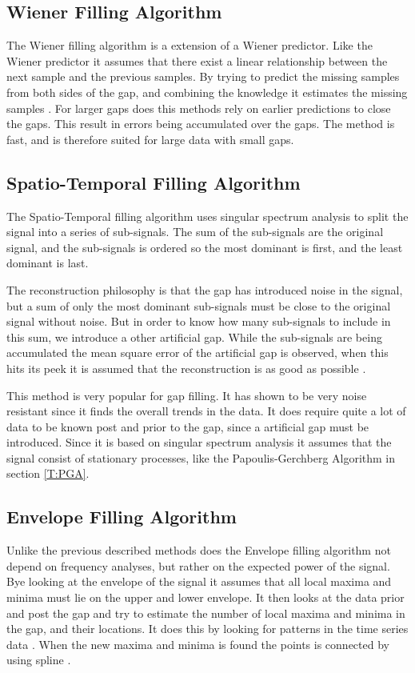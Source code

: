 \subsection{Wiener Filling Algorithm}
The Wiener filling algorithm is a extension of a Wiener predictor. Like the Wiener predictor it assumes that there exist a linear relationship between the next sample and the previous samples. By trying to predict the missing samples from both sides of the gap, and combining the knowledge it estimates the missing samples \citep{RefWorks:14}. For larger gaps does this methods rely on earlier predictions to close the gaps. This result in errors being accumulated over the gaps. The method is fast, and is therefore suited for large data with small gaps. 

\subsection{Spatio-Temporal Filling Algorithm}
The Spatio-Temporal filling algorithm uses singular spectrum analysis to split the signal into a series of sub-signals. The sum of the sub-signals are the original signal, and the sub-signals is ordered so the most dominant is first, and the least dominant is last. 

The reconstruction philosophy is that the gap has introduced noise in the signal, but a sum of only the most dominant sub-signals must be close to the original signal without noise. But in order to know how many sub-signals to include in this sum, we introduce a other artificial gap. While the sub-signals are being accumulated the mean square error of the artificial gap is observed, when this hits its peek it is assumed that the reconstruction is as good as possible \cite{RefWorks:15}.

This method is very popular for gap filling. It has shown to be very noise resistant since it finds the overall trends in the data. It does require quite a lot of data to be known post and prior to the gap, since a artificial gap must be introduced. Since it is based on singular spectrum analysis it assumes that the signal consist of stationary processes, like the Papoulis-Gerchberg Algorithm in section \ref{T:PGA}.

\subsection{Envelope Filling Algorithm}
\label{T:EGA}
Unlike the previous described methods does the Envelope filling algorithm not depend on frequency analyses, but rather on the expected power of the signal. Bye looking at the envelope of the signal it assumes that all local maxima and minima must lie on the  upper and lower envelope. It then looks at the data prior and post the gap and try to estimate the number of local maxima and minima in the gap, and their locations. It does this by looking for patterns in the time series data \citep{RefWorks:6}. When the new maxima and minima is found the points is connected by using spline \cite{RefWorks:16}. 

